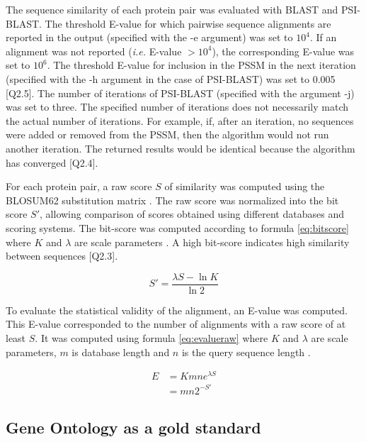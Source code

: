 \documentclass{article}
\begin{document}
The sequence similarity of each protein pair was evaluated with BLAST and PSI-BLAST. The threshold E-value for which pairwise sequence alignments are reported in the output (specified with the -e argument) was set to $10^{4}$. If an alignment was not reported (\textit{i.e.} E-value $> 10^{4}$), the corresponding E-value was set to $10^{6}$. The threshold E-value for inclusion in the PSSM in the next iteration (specified with the -h argument in the case of PSI-BLAST) was set to 0.005 [Q2.5]. The number of iterations of PSI-BLAST (specified with the argument -j) was set to three. The specified number of iterations does not necessarily match the actual number of iterations. For example, if, after an iteration, no sequences were added or removed from the PSSM, then the algorithm would not run another iteration. The returned results would be identical because the algorithm has converged [Q2.4].

For each protein pair, a raw score $S$ of similarity was computed using the BLOSUM62 substitution matrix \citep{henikoff_amino_1992}. The raw score was normalized into the bit score $S'$, allowing comparison of scores obtained using different databases and scoring systems. The bit-score was computed according to formula \eqref{eq:bitscore} where $K$ and $\lambda$ are scale parameters \citep{altschul_basic_1990}. A high bit-score indicates high similarity between sequences [Q2.3].

\begin{equation}
S' = \frac{\lambda S - \ln K}{\ln 2}
\label{eq:bitscore}
\end{equation}

To evaluate the statistical validity of the alignment, an E-value was computed. This E-value corresponded to the number of alignments with a raw score of at least $S$. It was computed using formula \eqref{eq:evalueraw} where $K$ and $\lambda$ are scale parameters, $m$ is database length and $n$ is the query sequence length \citep{altschul_basic_1990}.

\begin{subequations}
\begin{align}
E &= K m n e^{\lambda S} \label{eq:evalueraw} \\
&= m n 2^{-S'} \label{eq:evaluebit}
\end{align}
\end{subequations}

\subsection{Gene Ontology as a gold standard}
\label{sec:gold}
\end{document}

